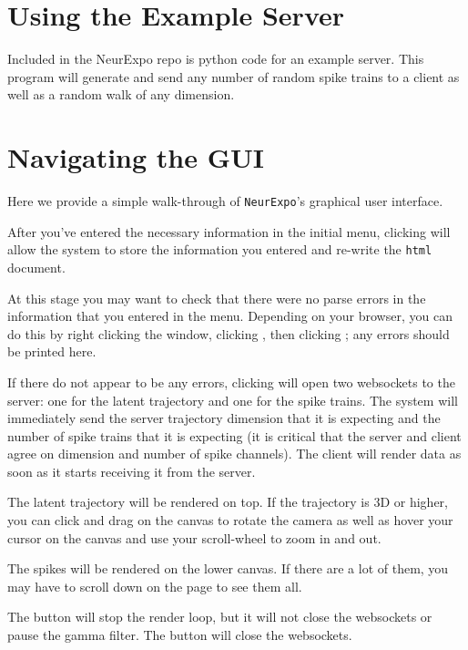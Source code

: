 \documentclass[12pt, openany]{book}
\begin{document}
\chapter{Using the Example Server}

Included in the NeurExpo repo is python code for an example server. This program will generate and send any number of random spike trains to a client as well as a random walk of any dimension.

\chapter{Navigating the GUI}

Here we provide a simple walk-through of \texttt{NeurExpo}'s graphical user interface.

After you've entered the necessary information in the initial menu, clicking  will allow the system to store the information you entered and re-write the \texttt{html} document.

At this stage you may want to check that there were no parse errors in the information that you entered in the menu. Depending on your browser, you can do this by right clicking the window, clicking , then clicking ; any errors should be printed here.

If there do not appear to be any errors, clicking  will open two websockets to the server: one for the latent trajectory and one for the spike trains. The system will immediately send the server trajectory dimension that it is expecting and the number of spike trains that it is expecting (it is critical that the server and client agree on dimension and number of spike channels). The client will render data as soon as it starts receiving it from the server.

The latent trajectory will be rendered on top. If the trajectory is 3D or higher, you can click and drag on the canvas to rotate the camera as well as hover your cursor on the canvas and use your scroll-wheel to zoom in and out.

The spikes will be rendered on the lower canvas. If there are a lot of them, you may have to scroll down on the page to see them all.

The  button will stop the render loop, but it will not close the websockets or pause the gamma filter. The  button will close the websockets.



\end{document}
